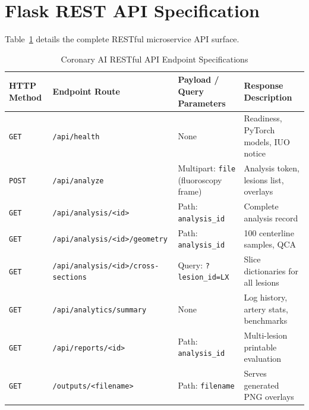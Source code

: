 \section{Flask REST API Specification}
Table~\ref{tab:api_endpoints} details the complete RESTful microservice API surface.

\begin{table}[H]
\centering
\caption{Coronary AI RESTful API Endpoint Specifications}
\label{tab:api_endpoints}
\small
\begin{tabular}{llp{5.5cm}p{3.5cm}}
\toprule
\textbf{HTTP Method} & \textbf{Endpoint Route} & \textbf{Payload / Query Parameters} & \textbf{Response Description} \\
\midrule
\texttt{GET} & \texttt{/api/health} & None & Readiness, PyTorch models, IUO notice \\
\texttt{POST} & \texttt{/api/analyze} & Multipart: \texttt{file} (fluoroscopy frame) & Analysis token, lesions list, overlays \\
\texttt{GET} & \texttt{/api/analysis/<id>} & Path: \texttt{analysis\_id} & Complete analysis record \\
\texttt{GET} & \texttt{/api/analysis/<id>/geometry} & Path: \texttt{analysis\_id} & 100 centerline samples, QCA \\
\texttt{GET} & \texttt{/api/analysis/<id>/cross-sections} & Query: \texttt{?lesion\_id=LX} & Slice dictionaries for all lesions \\
\texttt{GET} & \texttt{/api/analytics/summary} & None & Log history, artery stats, benchmarks \\
\texttt{GET} & \texttt{/api/reports/<id>} & Path: \texttt{analysis\_id} & Multi-lesion printable evaluation \\
\texttt{GET} & \texttt{/outputs/<filename>} & Path: \texttt{filename} & Serves generated PNG overlays \\
\bottomrule
\end{tabular}
\end{table}
